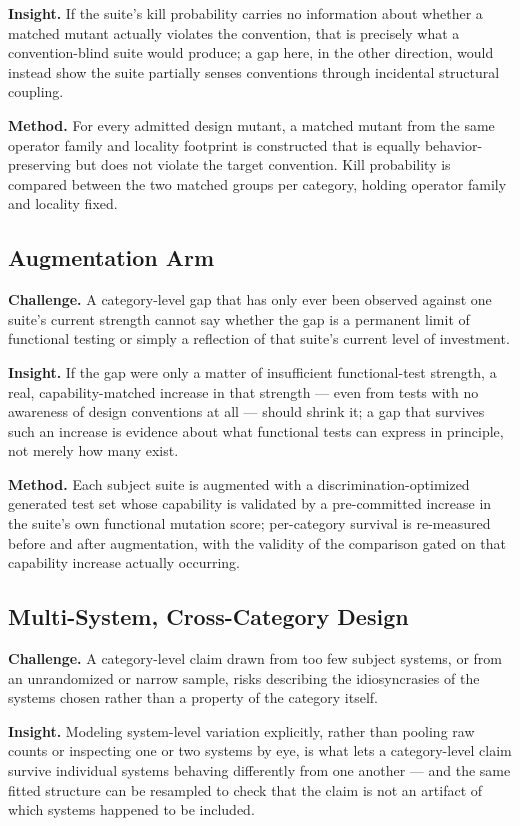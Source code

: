 \documentclass[11pt]{article}
\begin{document}
\textbf{Insight.} If the suite's kill probability carries no information about whether a matched mutant actually violates the convention, that is precisely what a convention-blind suite would produce; a gap here, in the other direction, would instead show the suite partially senses conventions through incidental structural coupling.

\textbf{Method.} For every admitted design mutant, a matched mutant from the same operator family and locality footprint is constructed that is equally behavior-preserving but does not violate the target convention. Kill probability is compared between the two matched groups per category, holding operator family and locality fixed.

\subsection{Augmentation Arm}
\textbf{Challenge.} A category-level gap that has only ever been observed against one suite's current strength cannot say whether the gap is a permanent limit of functional testing or simply a reflection of that suite's current level of investment.

\textbf{Insight.} If the gap were only a matter of insufficient functional-test strength, a real, capability-matched increase in that strength --- even from tests with no awareness of design conventions at all --- should shrink it; a gap that survives such an increase is evidence about what functional tests can express in principle, not merely how many exist.

\textbf{Method.} Each subject suite is augmented with a discrimination-optimized generated test set whose capability is validated by a pre-committed increase in the suite's own functional mutation score; per-category survival is re-measured before and after augmentation, with the validity of the comparison gated on that capability increase actually occurring.

\subsection{Multi-System, Cross-Category Design}
\textbf{Challenge.} A category-level claim drawn from too few subject systems, or from an unrandomized or narrow sample, risks describing the idiosyncrasies of the systems chosen rather than a property of the category itself.

\textbf{Insight.} Modeling system-level variation explicitly, rather than pooling raw counts or inspecting one or two systems by eye, is what lets a category-level claim survive individual systems behaving differently from one another --- and the same fitted structure can be resampled to check that the claim is not an artifact of which systems happened to be included.
\end{document}
